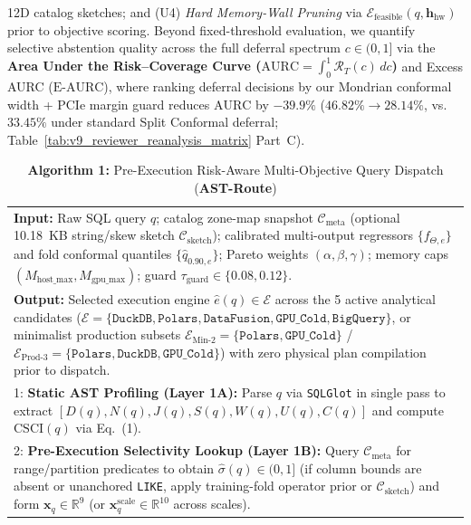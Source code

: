 \documentclass[10pt,a4paper]{article}
\newenvironment{fitasttable}{%
  \begin{lrbox}{\asttblbox}%
}{%
  \end{lrbox}%
  \sbox{\asttblboxB}{%
    \ifdim\wd\asttblbox>0.96\textwidth
      \resizebox{0.96\textwidth}{!}{\usebox{\asttblbox}}%
    \else
      \usebox{\asttblbox}%
    \fi
  }%
  \ifdim\ht\asttblboxB>0.72\textheight
    \resizebox{!}{0.72\textheight}{\usebox{\asttblboxB}}%
  \else
    \usebox{\asttblboxB}%
  \fi
}
\begin{document}
12D catalog sketches; and (U4) \emph{Hard Memory-Wall Pruning} via $\mathcal{E}_{\text{feasible}}(q, \mathbf{h}_{\text{hw}})$ prior to objective scoring. Beyond fixed-threshold evaluation, we quantify selective abstention quality across the full deferral spectrum $c \in (0,1]$ via the \textbf{Area Under the Risk--Coverage Curve ($\text{AURC} = \int_0^1 \mathcal{R}_{T}(c)\,dc$)} and Excess AURC ($\text{E-AURC}$), where ranking deferral decisions by our Mondrian conformal width + PCIe margin guard reduces $\text{AURC}$ by $\mathbf{-39.9\%}$ ($46.82\% \rightarrow 28.14\%$, vs.\ $33.45\%$ under standard Split Conformal deferral; Table~\ref{tab:v9_reviewer_reanalysis_matrix} Part~C).

\begin{table}[!t]
\centering
\caption*{{\bf Algorithm 1:} Pre-Execution Risk-Aware Multi-Objective Query Dispatch (\textbf{AST-Route})}\label{alg:ast_route}
\footnotesize
\begin{fitasttable}
\begin{tabular}{@{}p{}@{}}
\toprule
\textbf{Input:} Raw SQL query $q$; catalog zone-map snapshot $\mathcal{C}_{\text{meta}}$ (optional 10.18~KB string/skew sketch $\mathcal{C}_{\text{sketch}}$); calibrated multi-output regressors $\{f_{\Theta,e}\}$ and fold conformal quantiles $\{\hat{q}_{0.90,e}\}$; Pareto weights $(\alpha,\beta,\gamma)$; memory caps $(M_{\text{host\_max}}, M_{\text{gpu\_max}})$; guard $\tau_{\text{guard}}\in\{0.08, 0.12\}$. \\
\textbf{Output:} Selected execution engine $\hat{e}(q) \in \mathcal{E}$ across the 5 active analytical candidates ($\mathcal{E} = \{\texttt{DuckDB}, \texttt{Polars}, \texttt{DataFusion}, \texttt{GPU\_Cold}, \texttt{BigQuery}\}$, or minimalist production subsets $\mathcal{E}_{\text{Min-2}}=\{\texttt{Polars},\texttt{GPU\_Cold}\}$ / $\mathcal{E}_{\text{Prod-3}}=\{\texttt{Polars},\texttt{DuckDB},\texttt{GPU\_Cold}\}$) with zero physical plan compilation prior to dispatch. \\
\midrule
1: \textbf{Static AST Profiling (Layer 1A):} Parse $q$ via \texttt{SQLGlot} in single pass to extract $[D(q),N(q),J(q),S(q),W(q),U(q),C(q)]$ and compute $\text{CSCI}(q)$ via Eq.~(1). \\
2: \textbf{Pre-Execution Selectivity Lookup (Layer 1B):} Query $\mathcal{C}_{\text{meta}}$ for range/partition predicates to obtain $\hat{\sigma}(q) \in (0,1]$ (if column bounds are absent or unanchored \texttt{LIKE}, apply training-fold operator prior or $\mathcal{C}_{\text{sketch}}$) and form $\mathbf{x}_q \in \mathbb{R}^{9}$ (or $\mathbf{x}_q^{\text{scale}} \in \mathbb{R}^{10}$ across scales). \\

\end{tabular}
\end{fitasttable}
\end{table}
\end{document}
